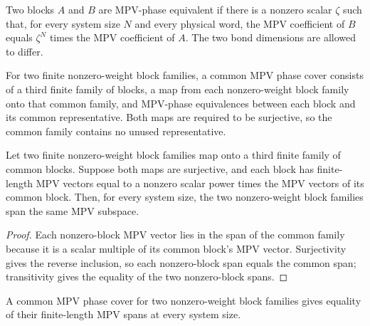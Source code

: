 \begin{definition}
\label{def:mpv_block_phase_equiv}
	\leanok
	Two blocks $A$ and $B$ are MPV-phase equivalent if there is a nonzero
	scalar $\zeta$ such that, for every system size $N$ and every physical word,
	the MPV coefficient of $B$ equals $\zeta^N$ times the MPV coefficient of $A$.
	The two bond dimensions are allowed to differ.
\end{definition}

\begin{definition}
\label{def:mpv_common_phase_cover}
	\leanok
	For two finite nonzero-weight block families, a common MPV phase cover consists of a third
	finite family of blocks, a map from each nonzero-weight block family onto that common
	family, and MPV-phase equivalences between each block and its common
	representative. Both maps are required to be surjective, so the common family
	contains no unused representative.
\end{definition}

\begin{lemma}%
\label{lem:nonzero_block_span_eq_of_common_phase_cover}
	\leanok
	Let two finite nonzero-weight block families map onto a third finite family of common
	blocks. Suppose both maps are surjective, and each block has finite-length
	MPV vectors equal to a nonzero scalar power times the MPV vectors of its common
	block. Then, for every system size, the two nonzero-weight block families span the same
	MPV subspace.
\end{lemma}

\begin{proof}
	\leanok
	Each nonzero-block MPV vector lies in the span of the common family because it is a
	scalar multiple of its common block's MPV vector. Surjectivity gives the reverse
	inclusion, so each nonzero-block span equals the common span; transitivity gives
	the equality of the two nonzero-block spans.
\end{proof}

\begin{lemma}%
\label{lem:mpv_common_phase_cover_span_eq}
	\leanok
	A common MPV phase cover for two nonzero-weight block families gives equality of their
	finite-length MPV spans at every system size.
\end{lemma}

